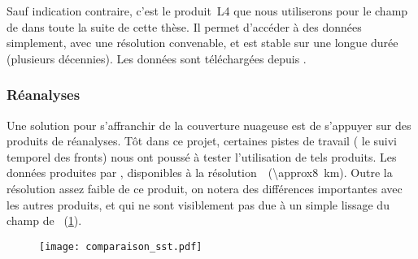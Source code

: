 Sauf indication contraire, c'est le produit~L4 que nous utiliserons pour le champ de  dans toute la suite de cette thèse.
Il permet d'accéder à des données  simplement, avec une résolution convenable, et est stable sur une longue durée (plusieurs décennies).
Les données sont téléchargées depuis .

\subsubsection{Réanalyses}

Une solution pour s'affranchir de la couverture nuageuse est de s'appuyer sur des produits de réanalyses.
Tôt dans ce projet, certaines pistes de travail ( le suivi temporel des fronts) nous ont poussé à tester l'utilisation de tels produits.
Les données produites par , disponibles à la résolution~~(\qty{\approx8}{\km}).
Outre la résolution assez faible de ce produit, on notera des différences importantes avec les autres produits, et qui ne sont visiblement pas due à un simple lissage du champ de ~(\cref{fig:comparaison-sst}).


\begin{figure}
  \texttt{[image: comparaison\_sst.pdf]}
  \label{fig:comparaison-sst}
\end{figure}

